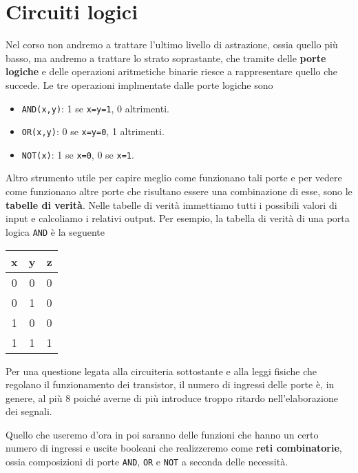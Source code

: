 \section{Circuiti logici}
Nel corso non andremo a trattare l'ultimo livello di astrazione, ossia quello più basso, ma andremo
a trattare lo strato soprastante, che tramite delle \textbf{porte logiche} e delle operazioni
aritmetiche binarie riesce a rappresentare quello che succede. Le tre operazioni implmentate dalle
porte logiche sono
\begin{itemize}
	\item \verb|AND(x,y)|: 1 se \verb|x=y=1|, 0 altrimenti.
	\item \verb|OR(x,y)|: 0 se \verb|x=y=0|, 1 altrimenti.
	\item \verb|NOT(x)|: 1 se \verb|x=0|, 0 se \verb|x=1|.
\end{itemize}
Altro strumento utile per capire meglio come funzionano tali porte e per vedere come funzionano
altre porte che risultano essere una combinazione di esse, sono le \textbf{tabelle di verità}.
Nelle tabelle di verità immettiamo tutti i possibili valori di input e calcoliamo i relativi output.
Per esempio, la tabella di verità di una porta logica \verb|AND| è la seguente
\begin{center}
	\begin{tabular}{c c | c}
		x & y & z \\ \hline
		0 & 0 & 0 \\
		0 & 1 & 0 \\
		1 & 0 & 0 \\
		1 & 1 & 1
	\end{tabular}
\end{center}
Per una questione legata alla circuiteria sottostante e alla leggi fisiche che regolano il
funzionamento dei transistor, il numero di ingressi delle porte è, in genere, al più 8 poiché
averne di più introduce troppo ritardo nell'elaborazione dei segnali.

Quello che useremo d'ora in poi saranno delle funzioni che hanno un certo numero di ingressi e
uscite booleani che realizzeremo come \textbf{reti combinatorie}, ossia composizioni di porte
\verb|AND|, \verb|OR| e \verb|NOT| a seconda delle necessità.

